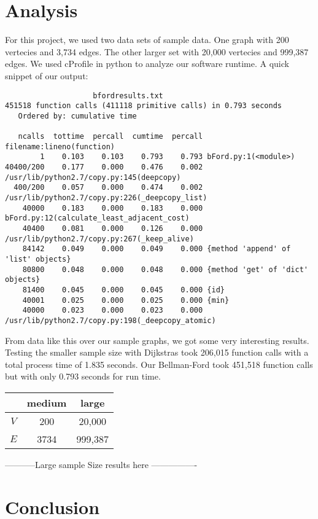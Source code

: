 \documentclass{article}
\begin{document}
\section{Analysis}
For this project, we used two data sets of sample data. One graph with 200 vertecies and 3,734 edges. The other larger set with 20,000 vertecies and 999,387 edges. We used cProfile in python to analyze our software runtime. A quick snippet of our output:
\begin{verbatim}
                    bfordresults.txt
451518 function calls (411118 primitive calls) in 0.793 seconds
   Ordered by: cumulative time

   ncalls  tottime  percall  cumtime  percall filename:lineno(function)
        1    0.103    0.103    0.793    0.793 bFord.py:1(<module>)
40400/200    0.177    0.000    0.476    0.002 /usr/lib/python2.7/copy.py:145(deepcopy)
  400/200    0.057    0.000    0.474    0.002 /usr/lib/python2.7/copy.py:226(_deepcopy_list)
    40000    0.183    0.000    0.183    0.000 bFord.py:12(calculate_least_adjacent_cost)
    40400    0.081    0.000    0.126    0.000 /usr/lib/python2.7/copy.py:267(_keep_alive)
    84142    0.049    0.000    0.049    0.000 {method 'append' of 'list' objects}
    80800    0.048    0.000    0.048    0.000 {method 'get' of 'dict' objects}
    81400    0.045    0.000    0.045    0.000 {id}
    40001    0.025    0.000    0.025    0.000 {min}
    40000    0.023    0.000    0.023    0.000 /usr/lib/python2.7/copy.py:198(_deepcopy_atomic)
\end{verbatim}

From data like this over our sample graphs, we got some very interesting results. Testing the smaller sample size with Dijkstras took 206,015 function calls with a total process time of 1.835 seconds. Our Bellman-Ford took 451,518 function calls but with only 0.793 seconds for run time. 

\begin{tabular}{||c|c|c||}
\hline
& medium & large \\
\hline
$V$ & 200 & 20,000\\
$E$ & 3734 & 999,387\\
\hline
\end{tabular}


-----------Large sample Size results here ----------------

\section{Conclusion}
\end{document}

